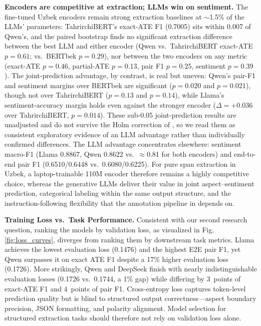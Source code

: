 \documentclass[bdcc,article,submit,moreauthors]{Definitions/mdpi}
\begin{document}
\textbf{Encoders are competitive at extraction; LLMs win on sentiment.} The fine-tuned Uzbek encoders remain strong extraction baselines at $\sim$1.5\% of the LLMs' parameters: TahrirchiBERT's exact-ATE F1 (0.7005) sits within 0.007 of Qwen's, and the paired bootstrap finds no significant extraction difference between the best LLM and either encoder (Qwen vs.\ TahrirchiBERT exact-ATE $p{=}0.61$; vs.\ BERTbek $p{=}0.29$), nor between the two encoders on any metric (exact-ATE $p{=}0.46$, partial-ATE $p{=}0.13$, pair F1 $p{=}0.25$, sentiment $p{=}0.39$). The joint-prediction advantage, by contrast, is real but uneven: Qwen's pair-F1 and sentiment margins over BERTbek are significant ($p{=}0.020$ and $p{=}0.021$), though not over TahrirchiBERT ($p{=}0.13$ and $p{=}0.14$), while Llama's sentiment-accuracy margin holds even against the stronger encoder ($\Delta{=}{+}0.036$ over TahrirchiBERT, $p{=}0.014$). These sub-0.05 joint-prediction results are unadjusted and do not survive the Holm correction of , so we read them as consistent exploratory evidence of an LLM advantage rather than individually confirmed differences. The LLM advantage concentrates elsewhere: sentiment macro-F1 (Llama 0.8867, Qwen 0.8622 vs.\ $\approx$0.81 for both encoders) and end-to-end pair F1 (0.6510/0.6448 vs.\ 0.6080/0.6225). For pure span extraction in Uzbek, a laptop-trainable 110M encoder therefore remains a highly competitive choice, whereas the generative LLMs deliver their value in joint aspect--sentiment prediction, categorical labeling within the same output structure, and the instruction-following flexibility that the annotation pipeline in  depends on.

\textbf{Training Loss vs.\ Task Performance.} Consistent with our second research question, ranking the models by validation loss, as visualized in Fig. \ref{fig:loss_curves}, diverges from ranking them by downstream task metrics.
Llama achieves the lowest evaluation loss (0.1476) and the highest E2E pair F1, yet Qwen surpasses it on exact ATE F1 despite a 17\% higher evaluation loss (0.1726). More strikingly, Qwen and DeepSeek finish with nearly indistinguishable evaluation losses (0.1726 vs.\ 0.1744, a 1\% gap) while differing by 3~points of exact-ATE F1 and 4~points of pair F1. Cross-entropy loss captures token-level prediction quality but is blind to structured output correctness---aspect boundary precision, JSON formatting, and polarity alignment. Model selection for structured extraction tasks should therefore not rely on validation loss alone.
\end{document}

